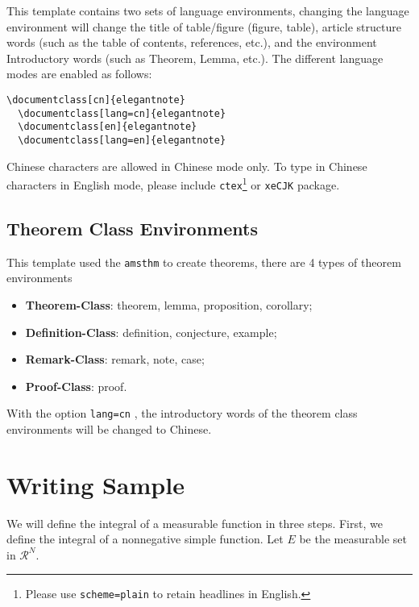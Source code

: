 \documentclass[en,hazy,blue,screen,14pt]{elegantnote}
\begin{document}
This template contains two sets of language environments, changing the language environment will change the title of table/figure (figure, table), article structure words (such as the table of contents, references, etc.), and the environment Introductory words (such as Theorem, Lemma, etc.). The different language modes are enabled as follows:
\begin{lstlisting}[frame=none]  
  \documentclass[cn]{elegantnote}
  \documentclass[lang=cn]{elegantnote}
  \documentclass[en]{elegantnote}
  \documentclass[lang=en]{elegantnote}
\end{lstlisting}

\begin{note}
Chinese characters are allowed in Chinese mode only. To type in Chinese characters in English mode, please include \lstinline{ctex}\footnote{Please use \lstinline{scheme=plain} to retain headlines in English.} or \lstinline{xeCJK} package.
\end{note}


\subsection{Theorem Class Environments}

This template used the \lstinline{amsthm} to create theorems, there are 4 types of theorem environments
\begin{itemize}
  \item \textbf{Theorem-Class}: theorem, lemma, proposition, corollary;
  \item \textbf{Definition-Class}: definition, conjecture, example;
  \item \textbf{Remark-Class}: remark, note, case;
  \item \textbf{Proof-Class}: proof.
\end{itemize}

\begin{remark}
With the option \lstinline{lang=cn} , the introductory words of the theorem class environments will be changed to Chinese.
\end{remark}


\section{Writing Sample}

We will define the integral of a measurable function in three steps. First, we define the integral of a nonnegative simple function. Let $E$ be the measurable set in $\mathcal{R}^N$.
\end{document}
